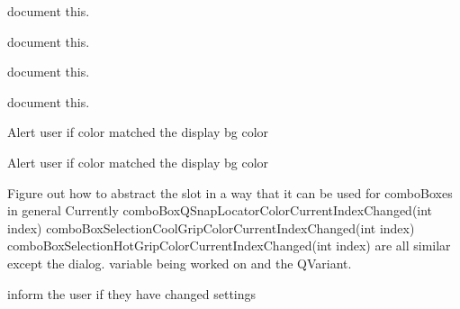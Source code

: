 \begin{DoxyRefList}
document this.  
\item[Member \mbox{\hyperlink{imgui__main_8c_a6dba10b6144666c41d7975f35c1d628d}{settings\+\_\+dialog\+\_\+choose\+General\+Mdi\+Background\+Texture}} (void)]\label{todo__todo000088}%
%
document this.  
\item[Member \mbox{\hyperlink{imgui__main_8c_a2ce7847993671cd77bf6bdd54422a193}{settings\+\_\+dialog\+\_\+choose\+Grid\+Color}} (void)]\label{todo__todo000091}%
%
document this.  
\item[Member \mbox{\hyperlink{imgui__main_8c_ad70b5a6243cc5e4e7e5c4b0c5c7b13de}{settings\+\_\+dialog\+\_\+choose\+Ruler\+Color}} (void)]\label{todo__todo000092}%
%
document this.  
\item[Member \mbox{\hyperlink{imgui__main_8c_a6f846feccfa72457fc96d98755125792}{settings\+\_\+dialog\+\_\+combobox\+\_\+selection\+Cool\+Grip\+Color\+Current\+Index\+Changed}} (int index)]\label{todo__todo000095}%
%
Alert user if color matched the display bg color  
\item[Member \mbox{\hyperlink{imgui__main_8c_a08a56754761663f6828ea5a3fcbe32f0}{settings\+\_\+dialog\+\_\+combobox\+\_\+selection\+Hot\+Grip\+Color\+Current\+Index\+Changed}} (int index)]\label{todo__todo000096}%
%
Alert user if color matched the display bg color  
\item[Member \mbox{\hyperlink{imgui__main_8c_a8589bf2d4c49136949e9d2e8bee1eccb}{settings\+\_\+dialog\+\_\+combo\+Box\+QSnap\+Locator\+Color\+Current\+Index\+Changed}} (int index)]\label{todo__todo000094}%
%
Figure out how to abstract the slot in a way that it can be used for combo\+Boxes in general Currently combo\+Box\+QSnap\+Locator\+Color\+Current\+Index\+Changed(int index) combo\+Box\+Selection\+Cool\+Grip\+Color\+Current\+Index\+Changed(int index) combo\+Box\+Selection\+Hot\+Grip\+Color\+Current\+Index\+Changed(int index) are all similar except the dialog. variable being worked on and the QVariant.  
\item[Member \mbox{\hyperlink{imgui__main_8c_ae691afdd89d577472aaf70d31e27d942}{settings\+\_\+dialog\+\_\+reject\+Changes}} (void)]\label{todo__todo000099}%
%
inform the user if they have changed settings 


\end{DoxyRefList}

